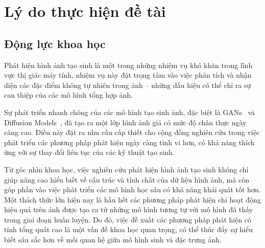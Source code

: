 \section{Lý do thực hiện đề tài}
%
\subsection{Động lực khoa học}
Phát hiện hình ảnh tạo sinh là một trong những nhiệm vụ khó khăn trong lĩnh vực thị giác máy tính, nhiệm vụ này đặt trọng tâm vào việc phân tích và nhận diện các đặc điểm không tự nhiên trong ảnh – những dấu hiệu có thể chỉ ra sự can thiệp của các mô hình tổng hợp ảnh. 
%
%

Sự phát triển nhanh chóng của các mô hình tạo sinh ảnh, đặc biệt là GANs~\cite{Goodfellow2014GenerativeAN} và Diffusion Models~\cite{Ho2020DenoisingDP}, đã tạo ra một lớp hình ảnh giả có mức độ chân thực ngày càng cao. Điều này đặt ra nhu cầu cấp thiết cho cộng đồng nghiên cứu trong việc phát triển các phương pháp phát hiện ngày càng tinh vi hơn, có khả năng thích ứng với sự thay đổi liên tục của các kỹ thuật tạo sinh.
%

Từ góc nhìn khoa học, việc nghiên cứu phát hiện hình ảnh tạo sinh không chỉ giúp nâng cao hiểu biết về cấu trúc và tính chất của dữ liệu hình ảnh, mà còn góp phần vào việc phát triển các mô hình học sâu có khả năng khái quát tốt hơn. Một thách thức lớn hiện nay là hầu hết các phương pháp phát hiện chỉ hoạt động hiệu quả trên ảnh được tạo ra từ những mô hình tương tự với mô hình đã thấy trong giai đoạn huấn luyện. Do đó, việc đề xuất các phương pháp phát hiện có tính tổng quát cao là một vấn đề khoa học quan trọng, có thể thúc đẩy sự hiểu biết sâu sắc hơn về mối quan hệ giữa mô hình sinh và đặc trưng ảnh.
%

